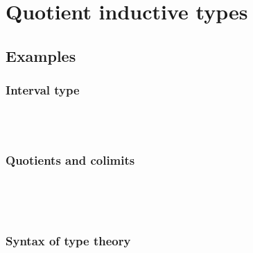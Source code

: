 \chapter{Quotient inductive types}

\section{Examples}

\subsection{Interval type}

\begin{datatype}{\intty}{\Set}
  \constr{\intzero}{\intty} \\
  \constr{\intone}{\intty} \\
  \constr{\intseg}{\intzero = \intone}
\end{datatype}

\subsection{Quotients and colimits}

\begin{datatype}{}{\Set}
   \\
\end{datatype}

\begin{datatype}{}{\Set}
   \\
\end{datatype}

\subsection{Syntax of type theory}

\begin{sorts}
  \sortnamety{\ttconty}{\Set} \\
  \sortnamety{\tttyty}{\ttconty \to \Set}
\end{sorts}

\begin{datatype}{\ttconty}{}
  \constr{\ttnil}{\ttconty} \\
  \constr{\ttcons{\_}{\_}}{(\Gamma : \ttconty) \to \tttyty\ \Gamma \to \ttconty}
\end{datatype}


